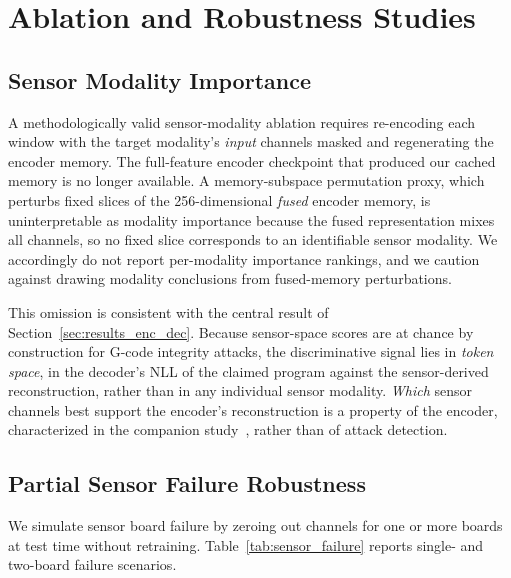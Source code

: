 \section{Ablation and Robustness Studies}
\label{sec:ablation}

\subsection{Sensor Modality Importance}
\label{sec:ablation_sensor}

A methodologically valid sensor-modality ablation requires re-encoding each window with the target modality's \emph{input} channels masked and regenerating the encoder memory. The full-feature encoder checkpoint that produced our cached memory is no longer available. A memory-subspace permutation proxy, which perturbs fixed slices of the 256-dimensional \emph{fused} encoder memory, is uninterpretable as modality importance because the fused representation mixes all channels, so no fixed slice corresponds to an identifiable sensor modality. We accordingly do not report per-modality importance rankings, and we caution against drawing modality conclusions from fused-memory perturbations.

This omission is consistent with the central result of Section~\ref{sec:results_enc_dec}. Because sensor-space scores are at chance by construction for G-code integrity attacks, the discriminative signal lies in \emph{token space}, in the decoder's NLL of the claimed program against the sensor-derived reconstruction, rather than in any individual sensor modality. \emph{Which} sensor channels best support the encoder's reconstruction is a property of the encoder, characterized in the companion study~\cite{eacuello2026decoder}, rather than of attack detection.

\subsection{Partial Sensor Failure Robustness}
\label{sec:ablation_partial}

We simulate sensor board failure by zeroing out channels for one or more boards at test time without retraining.
Table~\ref{tab:sensor_failure} reports single- and two-board failure scenarios.

